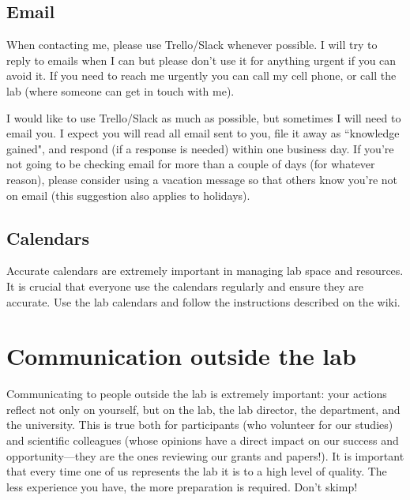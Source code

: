 \documentclass[letterpaper,12pt,oneside]{memoir}
\begin{document}
\subsection{Email}
When contacting me, please use Trello/Slack whenever possible. I will try to reply to emails when I can but please don't use it for anything urgent if you can avoid it. If you need to reach me urgently you can call my cell phone, or call the lab (where someone can get in touch with me). 

I would like to use Trello/Slack as much as possible, but sometimes I will need to email you. I expect you will read all email sent to you, file it away as ``knowledge gained", and respond (if a response is needed) within one business day. If you're not going to be checking email for more than a couple of days (for whatever reason), please consider using a vacation message so that others know you're not on email (this suggestion also applies to holidays).


\subsection{Calendars}

Accurate calendars are extremely important in managing lab space and resources. It is crucial that everyone use the calendars regularly and ensure they are accurate. Use the lab calendars and follow the instructions described on the wiki.






\section{Communication outside the lab}

Communicating to people outside the lab is extremely important: your actions reflect not only on yourself, but on the lab, the lab director, the department, and the university. This is true both for participants (who volunteer for our studies) and scientific colleagues (whose opinions have a direct impact on our success and opportunity---they are the ones reviewing our grants and papers!). It is important that every time one of us represents the lab it is to a high level of quality. The less experience you have, the more preparation is required. Don't skimp!
\end{document}
